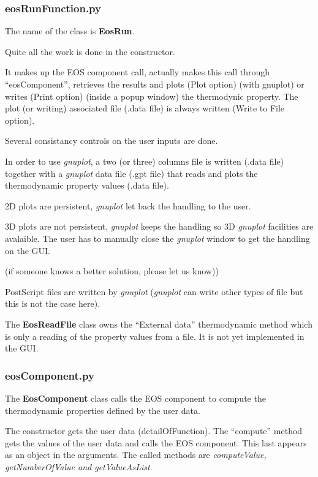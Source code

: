 \documentclass[10pt,a4paper]{article}
\begin{document}
\subsubsection{eosRunFunction.py}

The name of the class is \textbf{EosRun}.

Quite all the work is done in the constructor.

It makes up the EOS component call, actually makes this call through ``eosComponent'', retrieves the results and plots (Plot option) (with gnuplot) or writes
 (Print option) (inside a popup window) the thermodynic property. The plot (or writing) associated file (.data file) is always written (Write to File option).

Several consistancy controls on the user inputs are done.

In order to use \textit{gnuplot}, a two (or three) columns file is written (.data file) together with a \textit{gnuplot} data file (.gpt file) that reads and plots the thermodynamic property values (.data  file).

2D plots are persistent, \textit{gnuplot} let back the handling to the user.

3D plots are not persistent, \textit{gnuplot} keeps the handling so 3D \textit{gnuplot} facilities are avalaible. The user has to manually close the \textit{gnuplot} window to get the handling on the GUI. 

(if someone knows a better solution, please let us know))

PostScript files are written by \textit{gnuplot} (\textit{gnuplot} can write other types of file but this is not the case here).

The \textbf{EosReadFile} class owns the ``External data'' thermodynamic method which is only a reading of the property values from a file. It is not yet implemented in the GUI.

\subsubsection{eosComponent.py}

The \textbf{EosComponent} class calls the EOS component to compute the thermodynamic properties defined by the user data.

The constructor gets the user data (detailOfFunction).
The ``compute'' method gets the values of the user data and calls the EOS component. This last appears as an object in the arguments. The called methods are \textit{computeValue, getNumberOfValue and getValueAsList}.
\end{document}
